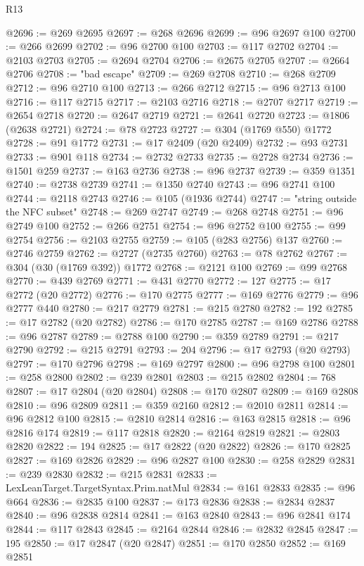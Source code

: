 \begin{lexlean}{R13}
\begin{coremodule}
@2696 := @269 @2695
@2697 := @268 @2696
@2699 := @96 @2697 @100
@2700 := @266 @2699
@2702 := @96 @2700 @100
@2703 := @117 @2702
@2704 := @2103 @2703
@2705 := @2694 @2704
@2706 := @2675 @2705
@2707 := @2664 @2706
@2708 := "bad escape"
@2709 := @269 @2708
@2710 := @268 @2709
@2712 := @96 @2710 @100
@2713 := @266 @2712
@2715 := @96 @2713 @100
@2716 := @117 @2715
@2717 := @2103 @2716
@2718 := @2707 @2717
@2719 := @2654 @2718
@2720 := @2647 @2719
@2721 := @2641 @2720
@2723 := @1806 (@2638 @2721)
@2724 := @78 @2723
@2727 := @304 (@1769 @550) @1772
@2728 := @91 @1772
@2731 := @17 @2409 (@20 @2409)
@2732 := @93 @2731
@2733 := @901 @118
@2734 := @2732 @2733
@2735 := @2728 @2734
@2736 := @1501 @259
@2737 := @163 @2736
@2738 := @96 @2737
@2739 := @359 @1351
@2740 := @2738 @2739
@2741 := @1350 @2740
@2743 := @96 @2741 @100
@2744 := @2118 @2743
@2746 := @105 (@1936 @2744)
@2747 := "string outside the NFC subset"
@2748 := @269 @2747
@2749 := @268 @2748
@2751 := @96 @2749 @100
@2752 := @266 @2751
@2754 := @96 @2752 @100
@2755 := @99 @2754
@2756 := @2103 @2755
@2759 := @105 (@283 @2756) @137
@2760 := @2746 @2759
@2762 := @2727 (@2735 @2760)
@2763 := @78 @2762
@2767 := @304 (@30 (@1769 @392)) @1772
@2768 := @2121 @100
@2769 := @99 @2768
@2770 := @439 @2769
@2771 := @431 @2770
@2772 := 127
@2775 := @17 @2772 (@20 @2772)
@2776 := @170 @2775
@2777 := @169 @2776
@2779 := @96 @2777 @440
@2780 := @217 @2779
@2781 := @215 @2780
@2782 := 192
@2785 := @17 @2782 (@20 @2782)
@2786 := @170 @2785
@2787 := @169 @2786
@2788 := @96 @2787
@2789 := @2788 @100
@2790 := @359 @2789
@2791 := @217 @2790
@2792 := @215 @2791
@2793 := 204
@2796 := @17 @2793 (@20 @2793)
@2797 := @170 @2796
@2798 := @169 @2797
@2800 := @96 @2798 @100
@2801 := @258 @2800
@2802 := @239 @2801
@2803 := @215 @2802
@2804 := 768
@2807 := @17 @2804 (@20 @2804)
@2808 := @170 @2807
@2809 := @169 @2808
@2810 := @96 @2809
@2811 := @359 @2160
@2812 := @2010 @2811
@2814 := @96 @2812 @100
@2815 := @2810 @2814
@2816 := @163 @2815
@2818 := @96 @2816 @174
@2819 := @117 @2818
@2820 := @2164 @2819
@2821 := @2803 @2820
@2822 := 194
@2825 := @17 @2822 (@20 @2822)
@2826 := @170 @2825
@2827 := @169 @2826
@2829 := @96 @2827 @100
@2830 := @258 @2829
@2831 := @239 @2830
@2832 := @215 @2831
@2833 := LexLeanTarget.TargetSyntax.Prim.natMul
@2834 := @161 @2833
@2835 := @96 @664
@2836 := @2835 @100
@2837 := @173 @2836
@2838 := @2834 @2837
@2840 := @96 @2838 @2814
@2841 := @163 @2840
@2843 := @96 @2841 @174
@2844 := @117 @2843
@2845 := @2164 @2844
@2846 := @2832 @2845
@2847 := 195
@2850 := @17 @2847 (@20 @2847)
@2851 := @170 @2850
@2852 := @169 @2851

\end{coremodule}
\end{lexlean}
